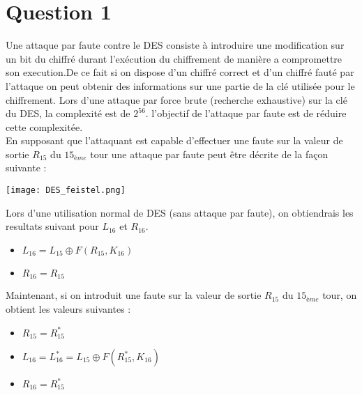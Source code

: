 \documentclass[a4paper,11pt]{article}
\title{\vspace{13em}{\huge Calcul sécurisé - Contrôle continu}}
\begin{document}
	
	\clearpage
	\maketitle\vspace{13em}
	\newpage
	\tableofcontents
	\newpage\clearpage{}
	
	\section{Question 1}
	Une attaque par faute contre le DES consiste à introduire une modification sur un bit du chiffré durant l'exécution du chiffrement de manière a compromettre son execution.De ce fait si on dispose d'un chiffré correct et d'un chiffré fauté par l'attaque on peut obtenir des informations sur une partie de  la clé utilisée pour le chiffrement.
	Lors d'une attaque par force brute (recherche exhaustive) sur la clé du DES, la complexité est de $2^{56}$. l'objectif de l'attaque par faute est de réduire cette complexitée.\\

	En supposant que l'attaquant est capable d'effectuer une faute sur la valeur de sortie $R_{15}$ du $15_{ème}$ tour une attaque par faute peut être décrite de la façon suivante :\\
	
	
	\begin{center}\texttt{[image: DES\_feistel.png]}\end{center}
	
	Lors d'une utilisation normal de DES (sans attaque par faute), on obtiendrais les resultats suivant pour $L_{16}$ et $R_{16}$.\\
	\begin{itemize}
		\item $L_{16} = L_{15} \oplus F(R_{15}, K_{16})$
		\item $R_{16} = R_{15}$
	\end{itemize}
	 
	Maintenant, si on introduit une faute sur la valeur de sortie $R_{15}$ du $15_{ème}$ tour, on obtient les valeurs suivantes :\\
	\begin{itemize}
		\item $R_{15} = R_{15}^{*}$ 
		\item $L_{16} = L_{16}^{*} = L_{15} \oplus F(R_{15}^{*}, K_{16})$
		\item $	R_{16} = R_{15}^{*}$
	\end{itemize}
	
\end{document}
